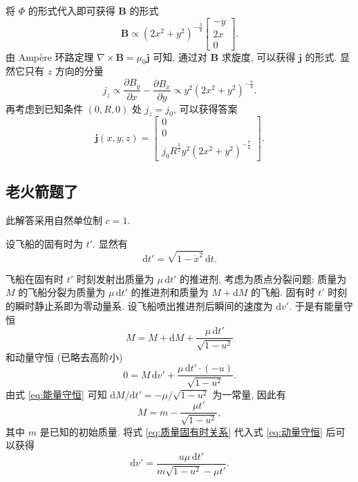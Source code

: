 \documentclass{article}
\begin{document}
将 $\Phi$ 的形式代入即可获得 $\mathbf B$ 的形式
\begin{equation}
	\mathbf B\propto\left(2x^2+y^2\right)^{-\frac34}
	\left[\begin{matrix}-y\\2x\\0\end{matrix}\right].
\end{equation}
由 Ampère 环路定理 $\nabla\times\mathbf B=\mu_0\mathbf j$ 可知,
通过对 $\mathbf B$ 求旋度, 可以获得 $\mathbf j$ 的形式.
显然它只有 $z$ 方向的分量
\begin{equation}
	j_z\propto\frac{\partial B_y}{\partial x}-\frac{\partial B_x}{\partial y}
	\propto y^2\left(2x^2+y^2\right)^{-\frac74}.
\end{equation}
再考虑到已知条件 $\left(0,R,0\right)$ 处 $j_z=j_0$, 可以获得答案
\begin{equation}
	\mathbf j\!\left(x,y,z\right)=\left[\begin{matrix}0\\0\\
	j_0R^{\frac32}y^2\left(2x^2+y^2\right)^{-\frac74}\end{matrix}\right].
\end{equation}

\subsection{老火箭题了}

此解答采用自然单位制 $c=1$.

设飞船的固有时为 $t'$.
显然有
\begin{equation}
	\label{eq:地面时固有时关系}
	\mathrm dt'=\sqrt{1-\dot x^2}\,\mathrm dt.
\end{equation}

飞船在固有时 $t'$ 时刻发射出质量为 $\mu\,\mathrm dt'$ 的推进剂, 考虑为质点分裂问题:
质量为 $M$ 的飞船分裂为质量为 $\mu\,\mathrm dt'$ 的推进剂和质量为 $M+\mathrm dM$ 的飞船.
固有时 $t'$ 时刻的瞬时静止系即为零动量系.
设飞船喷出推进剂后瞬间的速度为 $\mathrm dv'$.
于是有能量守恒
\begin{equation}
	\label{eq:能量守恒}
	M=M+\mathrm dM+\frac{\mu\,\mathrm dt'}{\sqrt{1-u^2}}
\end{equation}
和动量守恒 (已略去高阶小)
\begin{equation}
	\label{eq:动量守恒}
	0=M\,\mathrm dv'+\frac{\mu\,\mathrm dt'\cdot\left(-u\right)}{\sqrt{1-u^2}}.
\end{equation}
由式 \ref{eq:能量守恒} 可知 $\mathrm dM/\mathrm dt'=-\mu/\sqrt{1-u^2}$ 为一常量,
因此有
\begin{equation}
	\label{eq:质量固有时关系}
	M=m-\frac{\mu t'}{\sqrt{1-u^2}},
\end{equation}
其中 $m$ 是已知的初始质量.
将式 \ref{eq:质量固有时关系} 代入式 \ref{eq:动量守恒} 后可以获得
\begin{equation}
	\label{eq:v'}
	\mathrm dv'=\frac{u\mu\,\mathrm dt'}{m\sqrt{1-u^2}-\mu t'}.
\end{equation}
\end{document}
